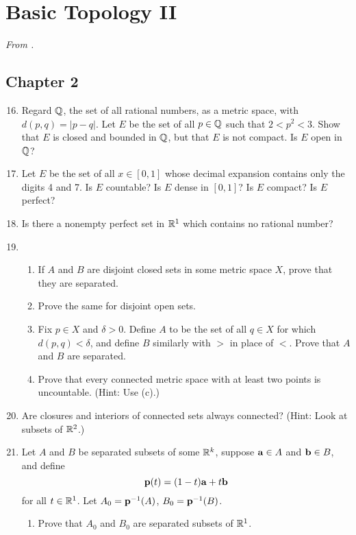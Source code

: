 \documentclass[../psets.tex]{subfiles}
\begin{document}
\section{Basic Topology II}
\emph{From \textcite{bib:Rudin}.}
\subsection*{Chapter 2}
\begin{enumerate}[label={\textbf{\arabic*.}}]
    \setcounter{enumi}{15}
    \item {}Regard $\mathbb{Q}$, the set of all rational numbers, as a metric space, with $d(p,q)=|p-q|$. Let $E$ be the set of all $p\in\mathbb{Q}$ such that $2<p^2<3$. Show that $E$ is closed and bounded in $\mathbb{Q}$, but that $E$ is not compact. Is $E$ open in $\mathbb{Q}$?
    \item Let $E$ be the set of all $x\in[0,1]$ whose decimal expansion contains only the digits 4 and 7. Is $E$ countable? Is $E$ dense in $[0,1]$? Is $E$ compact? Is $E$ perfect?
    \item Is there a nonempty perfect set in $\mathbb{R}^1$ which contains no rational number?
    \item 
    \begin{enumerate}
        \item If $A$ and $B$ are disjoint closed sets in some metric space $X$, prove that they are separated.
        \item Prove the same for disjoint open sets.
        \item Fix $p\in X$ and $\delta>0$. Define $A$ to be the set of all $q\in X$ for which $d(p,q)<\delta$, and define $B$ similarly with $>$ in place of $<$. Prove that $A$ and $B$ are separated.
        \item Prove that every connected metric space with at least two points is uncountable. (Hint: Use (c).)
    \end{enumerate}
    \item Are closures and interiors of connected sets always connected? (Hint: Look at subsets of $\mathbb{R}^2$.)
    \item Let $A$ and $B$ be separated subsets of some $\mathbb{R}^k$, suppose $\mathbf{a}\in A$ and $\mathbf{b}\in B$, and define
    \begin{equation*}
        \mathbf{p}(t) = (1-t)\mathbf{a}+t\mathbf{b}
    \end{equation*}
    for all $t\in\mathbb{R}^1$. Let $A_0=\mathbf{p}^{-1}(A)$, $B_0=\mathbf{p}^{-1}(B)$.
    \begin{enumerate}
        \item Prove that $A_0$ and $B_0$ are separated subsets of $\mathbb{R}^1$.

\end{enumerate}
\end{enumerate}
\end{document}
